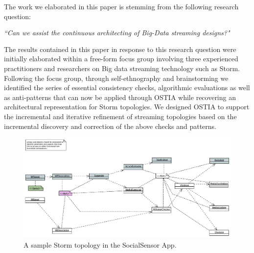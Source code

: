 
The work we elaborated in this paper is stemming from the following research question:

\begin{center}
\emph{``Can we assist the continuous architecting of Big-Data streaming designs?"}
\end{center}

The results contained in this paper in response to this research question were initially elaborated within a free-form focus group \cite{focusgroup} involving three experienced practitioners and researchers on Big data streaming technology such as Storm. Following the focus group, through self-ethnography \cite{selfeth} and brainstorming we identified the series of essential consistency checks, algorithmic evaluations as well as anti-patterns that can now be applied through OSTIA while recovering an architectural representation for Storm topologies. We designed OSTIA to support the incremental and iterative refinement of streaming topologies based on the incremental discovery and correction of the above checks and patterns.

\begin{figure}
\includegraphics[width=\textwidth]{images/socialsensor}
  \caption{A sample Storm topology in the SocialSensor App.}\label{topo1}
\end{figure}

